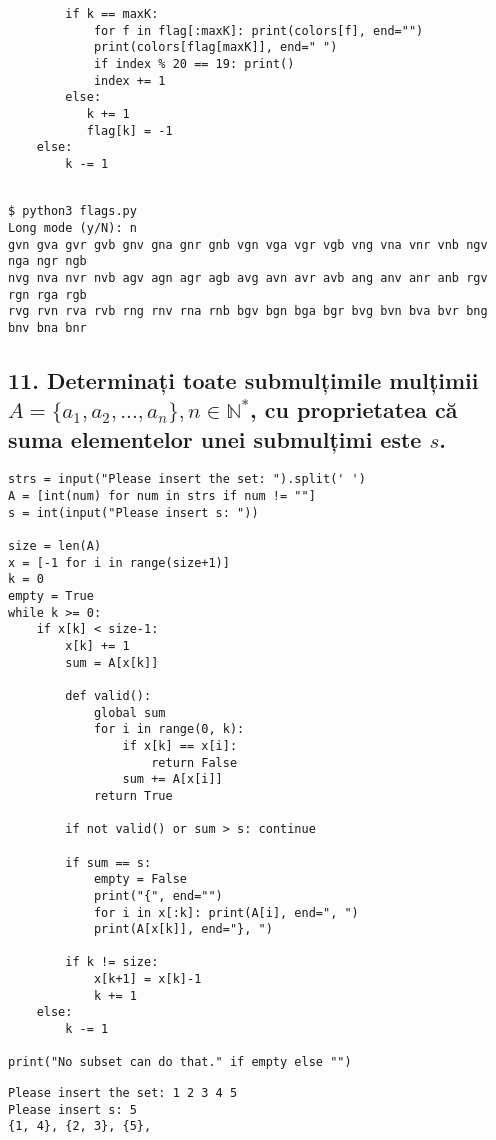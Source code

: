\documentclass[11pt]{article}
\begin{document}
\begin{itemize}
\begin{itemize}
\begin{verbatim}
        if k == maxK: 
            for f in flag[:maxK]: print(colors[f], end="")
            print(colors[flag[maxK]], end=" ")
            if index % 20 == 19: print()
            index += 1
        else:
           k += 1
           flag[k] = -1
    else:
        k -= 1


\end{verbatim}
\begin{verbatim}
$ python3 flags.py
Long mode (y/N): n
gvn gva gvr gvb gnv gna gnr gnb vgn vga vgr vgb vng vna vnr vnb ngv nga ngr ngb 
nvg nva nvr nvb agv agn agr agb avg avn avr avb ang anv anr anb rgv rgn rga rgb 
rvg rvn rva rvb rng rnv rna rnb bgv bgn bga bgr bvg bvn bva bvr bng bnv bna bnr 
\end{verbatim}

\subsection*{11. Determinați toate submulțimile mulțimii \(A = \{a_1, a_2, ..., a_n\}, n \in \mathbb{N}^*\), cu proprietatea că suma elementelor unei submulțimi este \(s\).}
\label{sec:org2254625}

\begin{verbatim}
strs = input("Please insert the set: ").split(' ')
A = [int(num) for num in strs if num != ""]
s = int(input("Please insert s: "))

size = len(A)
x = [-1 for i in range(size+1)]
k = 0
empty = True
while k >= 0:
    if x[k] < size-1:
        x[k] += 1        
        sum = A[x[k]]

        def valid():
            global sum
            for i in range(0, k):
                if x[k] == x[i]: 
                    return False
                sum += A[x[i]]
            return True

        if not valid() or sum > s: continue

        if sum == s:
            empty = False
            print("{", end="")
            for i in x[:k]: print(A[i], end=", ")
            print(A[x[k]], end="}, ")

        if k != size:
            x[k+1] = x[k]-1
            k += 1
    else:
        k -= 1

print("No subset can do that." if empty else "")
\end{verbatim}

\begin{verbatim}
Please insert the set: 1 2 3 4 5
Please insert s: 5
{1, 4}, {2, 3}, {5}, 


\end{verbatim}
\end{itemize}
\end{itemize}
\end{document}

